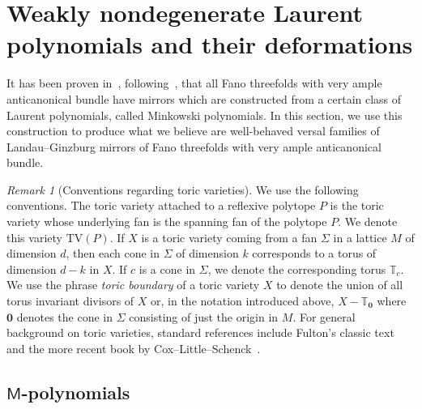 \documentclass[10pt]{amsart}
\numberwithin{equation}{section}
\theoremstyle{plain}
\theoremstyle{definition}
\theoremstyle{remark}
\newtheorem{remark}[theorem]{Remark}
\begin{document}
\section{Weakly nondegenerate Laurent polynomials and their deformations}\label{section:wreg}

It has been proven in~\cite{przyjalkowski2017compactification}, following~\cite{coates2016quantum}, that all Fano threefolds with very ample anticanonical bundle have mirrors which are constructed from a certain class of Laurent polynomials, called Minkowski polynomials. In this section, we use this construction to produce what we believe are well-behaved versal families of Landau--Ginzburg mirrors of Fano threefolds with very ample anticanonical bundle.

\begin{remark}[Conventions regarding toric varieties]
  We use the following conventions. The toric variety attached to a reflexive polytope \(P\) is the toric variety whose underlying fan is the spanning fan of the polytope \(P\). We denote this variety \(\mathrm{TV}(P)\). If \(X\) is a toric variety coming from a fan \(\Sigma\) in a lattice \(M\) of dimension \(d\), then each cone in \(\Sigma\) of dimension \(k\) corresponds to a torus of dimension \(d-k\) in \(X\). If \(c\) is a cone in \(\Sigma\), we denote the corresponding torus \(\mathbb{T}_c\). We use the phrase \emph{toric boundary} of a toric variety \(X\) to denote the union of all torus invariant divisors of \(X\) or, in the notation introduced above, \(X - \mathbb{T}_{\bm 0}\) where \({\bm 0}\) denotes the cone in \(\Sigma\) consisting of just the origin in \(M\). For general background on toric varieties, standard references include Fulton's classic text~\cite{fulton1993introduction} and the more recent book by Cox--Little--Schenck~\cite{cox2011toric}.
\end{remark}

\subsection{\texorpdfstring{\(\mathsf{M}\)}{M}-polynomials}\label{subsection:mink}
\end{document}
